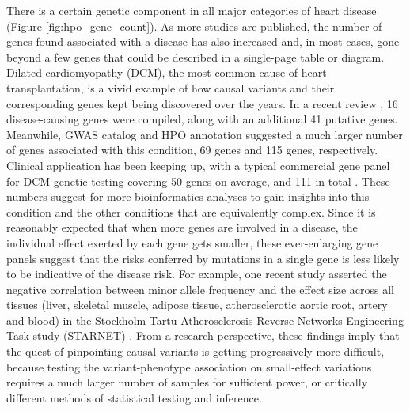 \documentclass[letter]{bioinfo}
\begin{document}
There is a certain genetic component in all major categories of heart disease (Figure \ref{fig:hpo_gene_count}).  As more studies are published, the number of genes found associated with a disease has also increased and, in most cases, gone beyond a few genes that could be described in a single-page table or diagram.  Dilated cardiomyopathy (DCM), the most common cause of heart transplantation, is a vivid example of how causal variants and their corresponding genes kept being discovered over the years.  In a recent review \citep{Burke:2016:Clinical}, 16 disease-causing genes were compiled, along with an additional 41 putative genes.  Meanwhile, GWAS catalog and HPO annotation suggested a much larger number of genes associated with this condition, 69 genes and 115 genes, respectively.  Clinical application has been keeping up, with a typical commercial gene panel for DCM genetic testing covering 50 genes on average, and 111 in total \citep{McNally:2017:Dilated}.  These numbers suggest for more bioinformatics analyses to gain insights into this condition and the other conditions that are equivalently complex.  Since it is reasonably expected that when more genes are involved in a disease, the individual effect exerted by each gene gets smaller, these ever-enlarging gene panels suggest that the risks conferred by mutations in a single gene is less likely to be indicative of the disease risk.  For example, one recent study asserted the negative correlation between minor allele frequency and the effect size across all tissues (liver, skeletal muscle, adipose tissue, atherosclerotic aortic root, artery and blood) in the Stockholm-Tartu Atherosclerosis Reverse Networks Engineering Task study (STARNET) \citep{Franzen:2016:Cardiometabolic}.  From a research perspective, these findings imply that the quest of pinpointing causal variants is getting progressively more difficult, because testing the variant-phenotype association on small-effect variations requires a much larger number of samples for sufficient power, or critically different methods of statistical testing and inference.
	
\end{document}
